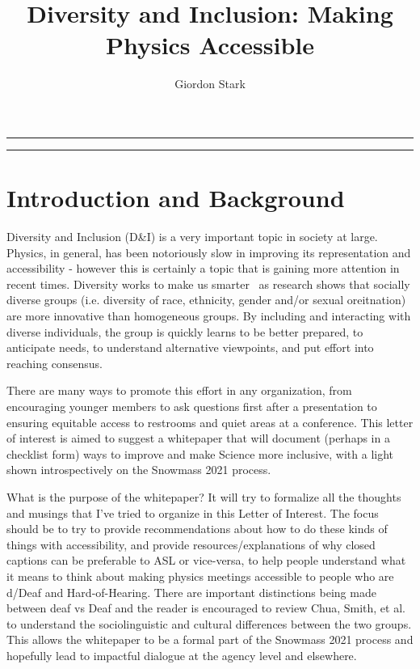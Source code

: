 \documentclass{article}
\title{Diversity and Inclusion: Making Physics Accessible}
\author[a]{Giordon Stark}
\affil[a]{SCIPP, UC Santa Cruz}
\date{}
\begin{document}
  \maketitle
  \hrule
  \vspace{0.5em}
  \hrule
  \vspace{2.5em}
  \section{Introduction and Background}
  Diversity and Inclusion (D\&I) is a very important topic in society at large. Physics, in general, has been notoriously slow in improving its representation and accessibility - however this is certainly a topic that is gaining more attention in recent times. Diversity works to make us smarter~\cite{HowDiversityWorks} as research shows that socially diverse groups (i.e. diversity of race, ethnicity, gender and/or sexual oreitnation) are more innovative than homogeneous groups. By including and interacting with diverse individuals, the group is quickly learns to be better prepared, to anticipate needs, to understand alternative viewpoints, and put effort into reaching consensus.

  There are many ways to promote this effort in any organization, from encouraging younger members to ask questions first after a presentation to ensuring equitable access to restrooms and quiet areas at a conference. This letter of interest is aimed to suggest a whitepaper that will document (perhaps in a checklist form) ways to improve and make Science more inclusive, with a light shown introspectively on the Snowmass 2021 process.

  What is the purpose of the whitepaper? It will try to formalize all the thoughts and musings that I've tried to organize in this Letter of Interest. The focus should be to try to provide recommendations about how to do these kinds of things with accessibility, and provide resources/explanations of why closed captions can be preferable to ASL or vice-versa, to help people understand what it means to think about making physics meetings accessible to people who are d/Deaf and Hard-of-Hearing. There are important distinctions being made between deaf vs Deaf and the reader is encouraged to review Chua, Smith, et al.~\cite{asee_peer_32676} to understand the sociolinguistic and cultural differences between the two groups. This allows the whitepaper to be a formal part of the Snowmass 2021 process and hopefully lead to impactful dialogue at the agency level and elsewhere.
\end{document}
